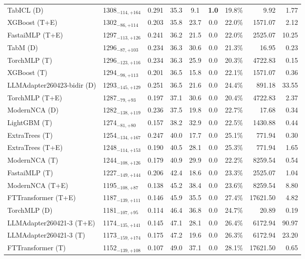 \begin{tabular}{llcccccrr}
TabICL (D) & 1308${}_{-114,+164}$ & 0.291 & 35.3 & 9.1 & \textcolor{bronze}{\textbf{1.0}} & 19.8\% & 9.92 & 1.77 \\
XGBoost (T+E) & 1302${}_{-86,+114}$ & 0.203 & 35.8 & 23.7 & 0.0 & 22.0\% & 1571.07 & 2.12 \\
FastaiMLP (T+E) & 1297${}_{-113,+126}$ & 0.241 & 36.2 & 21.5 & 0.0 & 22.0\% & 2525.07 & 10.25 \\
TabM (D) & 1296${}_{-87,+103}$ & 0.234 & 36.3 & 30.6 & 0.0 & 21.3\% & 16.95 & 0.23 \\
TorchMLP (T) & 1296${}_{-123,+116}$ & 0.234 & 36.3 & 25.9 & 0.0 & 20.3\% & 4722.83 & 0.15 \\
XGBoost (T) & 1294${}_{-98,+113}$ & 0.201 & 36.5 & 15.8 & 0.0 & 22.1\% & 1571.07 & 0.36 \\
LLMAdapter260423-bidir (D) & 1293${}_{-145,+129}$ & 0.251 & 36.5 & 21.6 & 0.0 & 24.4\% & 891.18 & 33.55 \\
TorchMLP (T+E) & 1287${}_{-79,+93}$ & 0.197 & 37.1 & 30.6 & 0.0 & 20.4\% & 4722.83 & 2.37 \\
ModernNCA (D) & 1282${}_{-138,+119}$ & 0.236 & 37.5 & 19.8 & 0.0 & 22.7\% & 17.68 & 0.34 \\
LightGBM (T) & 1274${}_{-81,+80}$ & 0.157 & 38.2 & 32.9 & 0.0 & 22.5\% & 1430.88 & 0.44 \\
ExtraTrees (T) & 1254${}_{-134,+167}$ & 0.247 & 40.0 & 17.7 & 0.0 & 25.1\% & 771.94 & 0.30 \\
ExtraTrees (T+E) & 1248${}_{-114,+153}$ & 0.190 & 40.5 & 28.1 & 0.0 & 25.3\% & 771.94 & 1.65 \\
ModernNCA (T) & 1244${}_{-108,+126}$ & 0.179 & 40.9 & 29.9 & 0.0 & 22.2\% & 8259.54 & 0.54 \\
FastaiMLP (T) & 1227${}_{-149,+144}$ & 0.206 & 42.4 & 18.6 & 0.0 & 23.3\% & 2525.07 & 1.04 \\
ModernNCA (T+E) & 1195${}_{-108,+87}$ & 0.138 & 45.2 & 38.4 & 0.0 & 23.6\% & 8259.54 & 8.80 \\
FTTransformer (T+E) & 1187${}_{-139,+111}$ & 0.146 & 45.9 & 35.5 & 0.0 & 27.4\% & 17621.50 & 4.82 \\
TorchMLP (D) & 1181${}_{-107,+95}$ & 0.114 & 46.4 & 36.8 & 0.0 & 24.7\% & 20.89 & 0.19 \\
LLMAdapter260421-3 (T+E) & 1174${}_{-135,+141}$ & 0.145 & 47.1 & 28.1 & 0.0 & 26.4\% & 6172.94 & 90.97 \\
LLMAdapter260421-3 (T) & 1173${}_{-159,+174}$ & 0.175 & 47.2 & 19.6 & 0.0 & 26.3\% & 6172.94 & 23.20 \\
FTTransformer (T) & 1152${}_{-139,+108}$ & 0.107 & 49.0 & 37.1 & 0.0 & 28.1\% & 17621.50 & 0.65 \\

\end{tabular}
